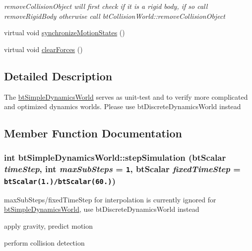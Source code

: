 \begin{CompactItemize}
\begin{CompactList}\small\item\em removeCollisionObject will first check if it is a rigid body, if so call removeRigidBody otherwise call btCollisionWorld::removeCollisionObject \item\end{CompactList}\item 
virtual void \hyperlink{classbt_simple_dynamics_world_91e996f5ce6e465e805565ee0ba14824}{synchronizeMotionStates} ()
\item 
virtual void \hyperlink{classbt_simple_dynamics_world_c44c80444f4d6d4e3c2955dd43b7a93a}{clearForces} ()
\end{CompactItemize}


\subsection{Detailed Description}
The \hyperlink{classbt_simple_dynamics_world}{btSimpleDynamicsWorld} serves as unit-test and to verify more complicated and optimized dynamics worlds. Please use btDiscreteDynamicsWorld instead 

\subsection{Member Function Documentation}
\hypertarget{classbt_simple_dynamics_world_f6b4810b5018cbaf09f82839111a243d}{
\subsubsection[stepSimulation]{\setlength{\rightskip}{0pt plus 5cm}int btSimpleDynamicsWorld::stepSimulation (btScalar {\em timeStep}, \/  int {\em maxSubSteps} = {\tt 1}, \/  btScalar {\em fixedTimeStep} = {\tt btScalar(1.)/btScalar(60.)})}}
\label{classbt_simple_dynamics_world_f6b4810b5018cbaf09f82839111a243d}


maxSubSteps/fixedTimeStep for interpolation is currently ignored for \hyperlink{classbt_simple_dynamics_world}{btSimpleDynamicsWorld}, use btDiscreteDynamicsWorld instead 



apply gravity, predict motion

perform collision detection

